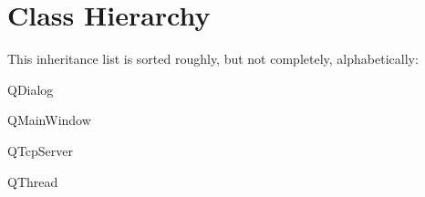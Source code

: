 \section{Class Hierarchy}
This inheritance list is sorted roughly, but not completely, alphabetically\+:\begin{DoxyCompactList}
\item {}
\item Q\+Dialog\begin{DoxyCompactList}
\item {}
\end{DoxyCompactList}
\item Q\+Main\+Window\begin{DoxyCompactList}
\item {}
\end{DoxyCompactList}
\item Q\+Tcp\+Server\begin{DoxyCompactList}
\item {}
\end{DoxyCompactList}
\item Q\+Thread\begin{DoxyCompactList}
\item {}
\end{DoxyCompactList}
\item {}
\begin{DoxyCompactList}
\item {}
\end{DoxyCompactList}
\item {}
\begin{DoxyCompactList}
\item {}
\end{DoxyCompactList}
\end{DoxyCompactList}
